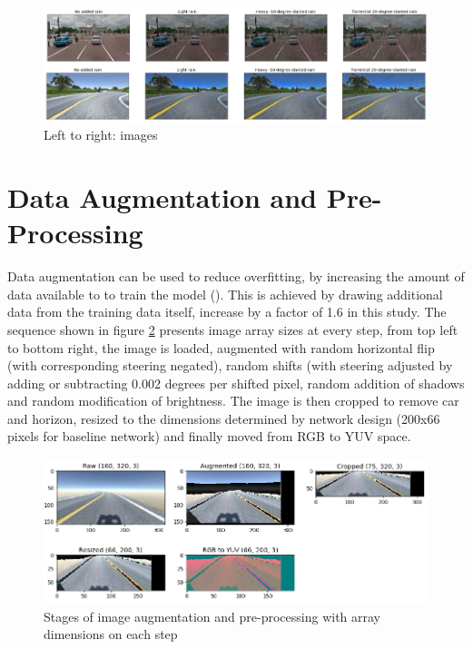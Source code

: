 \begin{figure}[h!]
\centering
\includegraphics[width=\textwidth]{Figures/AutomoldRain.png}
\caption{Left to right: images}
\label{fig:AutomoldRoadAugmentationLibrary}
\end{figure}

\section{Data Augmentation and Pre-Processing}

Data augmentation can be used to reduce overfitting, by increasing the amount of data available to to train the model (\cite{perez2017effectiveness}). This is achieved by drawing additional data from the training data itself, increase by a factor of 1.6 in this study.
The sequence shown in figure \ref{fig:augpreproc} presents image array sizes at every step, from top left to bottom right, the image is loaded, augmented with random horizontal flip (with corresponding steering negated), random shifts (with steering adjusted by adding or subtracting 0.002 degrees per shifted pixel, random addition of shadows and random modification of brightness. 
The image is then cropped to remove car and horizon, resized to the dimensions determined by network design (200x66 pixels for baseline network) and finally moved from RGB to YUV space.

\begin{figure}[ht]
 \centering 
 \includegraphics[width=\textwidth]{Figures/AugmentationPreProcessing.png}
 \caption{Stages of image augmentation and pre-processing with array dimensions on each step}
 \label{fig:augpreproc}
\end{figure}

